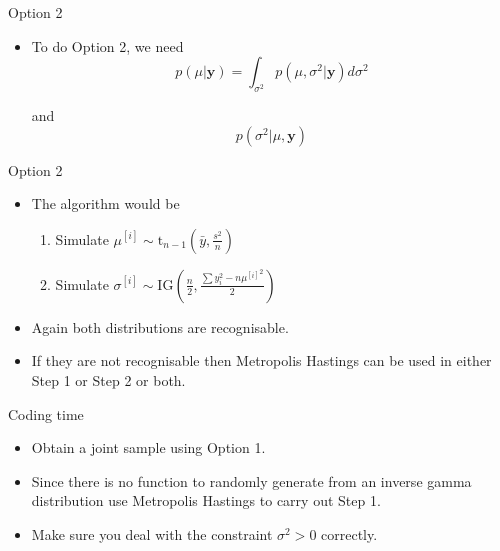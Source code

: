 \documentclass[10pt]{beamer}
\begin{document}
\begin{frame}{Option 2}
  \begin{itemize}
  \item To do Option 2, we need
    \begin{equation}
      p(\mu|{\bm y})=\int_{\sigma^2} p(\mu,\sigma^2|{\bm y})d\sigma^2
    \end{equation}

    and
    \begin{equation}
      p(\sigma^2|\mu,{\bm y})
    \end{equation}
  \end{itemize}
\end{frame}
\begin{frame}{Option 2}
  \begin{itemize}
  \item The algorithm would be

    \begin{enumerate}
    \item Simulate ${\mu}^{[i]}\sim
      \mbox{t}_{n-1}\left(\bar{y},\frac{s^2}{n}\right)$
    \item Simulate ${\sigma}^{[i]}\sim
      \mbox{IG}\left(\frac{n}{2},\frac{\sum y_i^2-n{\mu^{[i]}}^2}{2}\right)$
    \end{enumerate}

  \item Again both distributions are recognisable.

  \item If they are not recognisable then Metropolis Hastings can be used in either Step 1 or Step 2 or both.
  \end{itemize}
\end{frame}
\begin{frame}{Coding time}
  \begin{itemize}
  \item Obtain a joint sample using Option 1.

  \item Since there is no function to randomly generate from an inverse gamma distribution use Metropolis Hastings to carry out Step 1.

  \item Make sure you deal with the constraint $\sigma^2>0$ correctly.
  \end{itemize}
\end{frame}
\end{document}
